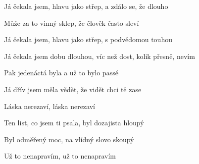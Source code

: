 \begin{song}
\bigskip

\Refren

\bigskip

Já čekala jsem, hlavu jako střep, a zdálo se, že dlouho \par
{}Může za to vinný sklep, že člověk  často sleví \par
Já čekala jsem, hlavu jako střep,  s podvědomou touhou \par
Já čekala jsem dobu dlouhou, víc než dost, kolik přesně, nevím \par

\bigskip

Pak jedenáctá byla a už to bylo passé \par
Já dřív jsem měla vědět, že vidět chci tě zase \par
{}Láska nerezaví, láska nerezaví \par

\bigskip

Ten list, co jsem ti psala, byl dozajista hloupý \par
Byl odměřený moc, na vlídný slovo skoupý \par
{}Už to nenapravím, už to nenapravím \par

\bigskip

\Refren \par
{}

\end{song}